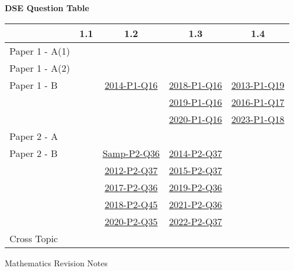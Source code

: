 \documentclass[12pt, a4paper]{article}
\begin{document}
\begin{absolutelynopagebreak}
\begin{center}
\textbf{DSE Question Table}
\end{center}
\begin{center}
\begin{tabular}{|l|c|c|c|c|}
\hline
        & 1.1 & 1.2 & 1.3 & 1.4 \\\hline
\hline
Paper 1 - A(1)&  &  &  &  \\
\hline
Paper 1 - A(2)&  &  &  &  \\
\hline
Paper 1 - B&  & \hyperref[DSE2014-CoreP1-Q16]{2014-P1-Q16} & \hyperref[DSE2018-CoreP1-Q16]{2018-P1-Q16} & \hyperref[DSE2013-CoreP1-Q19]{2013-P1-Q19} \\
&  &  & \hyperref[DSE2019-CoreP1-Q16]{2019-P1-Q16} & \hyperref[DSE2016-CoreP1-Q17]{2016-P1-Q17} \\
&  &  & \hyperref[DSE2020-CoreP1-Q16]{2020-P1-Q16} & \hyperref[DSE2023-CoreP1-Q18]{2023-P1-Q18} \\
\hline
\hline
Paper 2 - A&  &  &  &  \\
\hline
Paper 2 - B&  & \hyperref[DSE2012S-CoreP2-Q36]{Samp-P2-Q36} & \hyperref[DSE2014-CoreP2-Q37]{2014-P2-Q37} &  \\
&  & \hyperref[DSE2012-CoreP2-Q37]{2012-P2-Q37} & \hyperref[DSE2015-CoreP2-Q37]{2015-P2-Q37} &  \\
&  & \hyperref[DSE2017-CoreP2-Q36]{2017-P2-Q36} & \hyperref[DSE2019-CoreP2-Q36]{2019-P2-Q36} &  \\
&  & \hyperref[DSE2018-CoreP2-Q45]{2018-P2-Q45} & \hyperref[DSE2021-CoreP2-Q36]{2021-P2-Q36} &  \\
&  & \hyperref[DSE2020-CoreP2-Q35]{2020-P2-Q35} & \hyperref[DSE2022-CoreP2-Q37]{2022-P2-Q37} &  \\
\hline
\hline
Cross Topic&  &  &  &  \\
\hline
\end{tabular}
\end{center}
\end{absolutelynopagebreak}
\newpage
\newpage
\thispagestyle{empty}
\begin{center}
Mathematics Revision Notes\\\vspace{1cm}
\\\vspace{1cm}
{\fontsize{24pt}{24pt}\selectfont {Summation of Arithmetic and Geometric Sequences \NF}} \\\vspace{1cm}
\label{chapter:S6-2}

\end{center}
\vspace{0.5cm}
\hline
\end{document}
